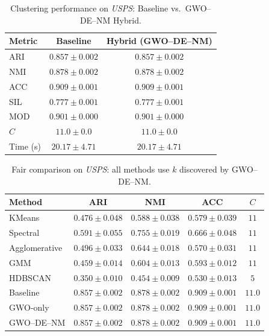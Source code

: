 \begin{table}[htbp]
\centering
\caption{Clustering performance on \textit{USPS}: Baseline vs.\ GWO--DE--NM Hybrid.}
\label{tab:usps}
\begin{tabular}{lcc}
\toprule
Metric & Baseline & Hybrid (GWO--DE--NM) \\
\midrule
ARI & $0.857 \pm 0.002$ & $\mathbf{0.857 \pm 0.002}$ \\
NMI & $0.878 \pm 0.002$ & $\mathbf{0.878 \pm 0.002}$ \\
ACC & $0.909 \pm 0.001$ & $\mathbf{0.909 \pm 0.001}$ \\
SIL & $0.777 \pm 0.001$ & $\mathbf{0.777 \pm 0.001}$ \\
MOD & $0.901 \pm 0.000$ & $\mathbf{0.901 \pm 0.000}$ \\
\midrule
$C$ & $11.0 \pm 0.0$ & $11.0 \pm 0.0$ \\
Time (s) & $20.17 \pm 4.71$ & $20.17 \pm 4.71$ \\
\bottomrule
\end{tabular}
\end{table}

\begin{table}[htbp]
\centering\small
\caption{Fair comparison on \textit{USPS}: all methods use $k$ discovered by GWO--DE--NM.}
\label{tab:fair_usps}
\begin{tabular}{lcccc}
\toprule
Method & ARI & NMI & ACC & $C$ \\
\midrule
KMeans & $0.476 \pm 0.048$ & $0.588 \pm 0.038$ & $0.579 \pm 0.039$ & $11$ \\
Spectral & $0.591 \pm 0.055$ & $0.755 \pm 0.019$ & $0.666 \pm 0.048$ & $11$ \\
Agglomerative & $0.496 \pm 0.033$ & $0.644 \pm 0.018$ & $0.570 \pm 0.031$ & $11$ \\
GMM & $0.459 \pm 0.014$ & $0.604 \pm 0.013$ & $0.593 \pm 0.012$ & $11$ \\
HDBSCAN & $0.350 \pm 0.010$ & $0.454 \pm 0.009$ & $0.530 \pm 0.013$ & $5$ \\
\midrule
Baseline & $\mathbf{0.857 \pm 0.002}$ & $0.878 \pm 0.002$ & $0.909 \pm 0.001$ & $11.0$ \\
GWO-only & $0.857 \pm 0.002$ & $0.878 \pm 0.002$ & $0.909 \pm 0.001$ & $11.0$ \\
GWO--DE--NM & $0.857 \pm 0.002$ & $0.878 \pm 0.002$ & $0.909 \pm 0.001$ & $11.0$ \\
\bottomrule
\end{tabular}
\end{table}

